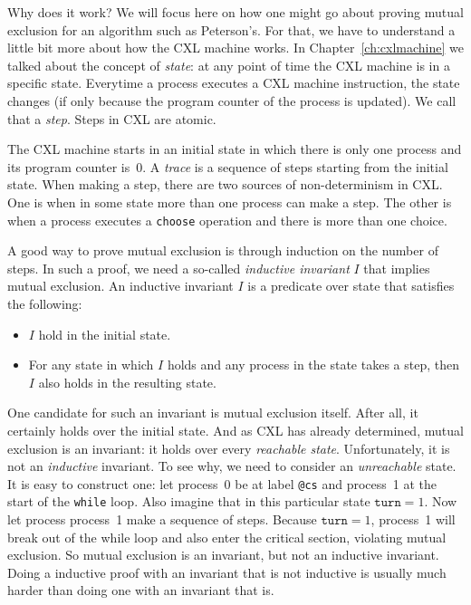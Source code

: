 \documentclass{report}
\begin{document}
Why does it work?  We will focus here on how one might go about proving
mutual exclusion for an algorithm such as Peterson's.
For that, we have to understand a little bit more about how the CXL
machine works.
In Chapter~\ref{ch:cxlmachine} we talked about the concept of \emph{state}:
at any point of time the CXL machine is in a specific state.
Everytime a process executes a CXL machine instruction, the
state changes (if only because the program counter of the process is
updated).  We call that a \emph{step}.  Steps in CXL are atomic.

The CXL machine starts in an initial state in which there is only
one process and its program counter is~0.  A \emph{trace} is a
sequence of steps starting from the initial state.  When making a
step, there are two sources of non-determinism in CXL.  One is when
in some state more than one process can make a step.  The other is
when a process executes a \texttt{choose} operation and there is
more than one choice.

A good way to prove mutual exclusion is through induction on
the number of steps.
In such a proof, we need a so-called \emph{inductive invariant} $I$ that
implies mutual exclusion.
An inductive invariant $I$ is a predicate over state that satisfies the following:
\begin{itemize}
\item $I$ hold in the initial state.
\item For any state in which $I$ holds and any process in the
state takes a step, then $I$ also holds in the resulting state.
\end{itemize}

One candidate for such an invariant is mutual exclusion itself.
After all, it certainly holds over the initial state.
And as CXL has already determined, mutual exclusion is an invariant:
it holds over every \emph{reachable state}.
Unfortunately, it is not an \emph{inductive} invariant.
To see why, we need to consider an \emph{unreachable} state.
It is easy to construct one: let process~0 be at label \texttt{@cs}
and process~1 at the start of the \texttt{while} loop.
Also imagine that in this particular state $\mathtt{turn} = 1$.  Now let
process process~1 make a sequence of steps.  Because $\mathtt{turn} = 1$,
process~1 will break out of the while loop and also enter the critical
section, violating mutual exclusion.
So mutual exclusion is an invariant, but not an inductive invariant.
Doing a inductive proof with an invariant that is not inductive is usually
much harder than doing one with an invariant that is.
\end{document}
